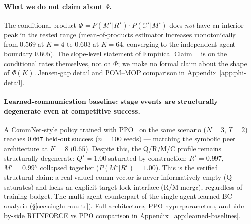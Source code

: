 \documentclass{article}
\begin{document}
\paragraph{What we do not claim about $\Phi$.} The conditional product $\Phi = P(M^\star|R^\star)\!\cdot\!P(C^\star|M^\star)$ does \emph{not} have an interior peak in the tested range (mean-of-products estimator increases monotonically from $0.569$ at $K{=}4$ to $0.603$ at $K{=}64$, converging to the independent-agent boundary $0.605$). The slope-level statement of Empirical Claim~1 is on the conditional rates themselves, not on $\Phi$; we make no formal claim about the shape of $\Phi(K)$. Jensen-gap detail and POM--MOP comparison in Appendix~\ref{app:phi-detail}.

\paragraph{Learned-communication baseline: stage events are structurally degenerate even at competitive success.}
A CommNet-style policy \citep{sukhbaatar2016commnet} trained with PPO~\citep{schulman2017proximal} on the same scenario ($N{=}3$, $T{=}2$) reaches $0.667$ held-out success ($n{=}100$ seeds) --- matching the symbolic peer architecture at $K{=}8$ ($0.65$). Despite this, the Q/R/M/C profile remains structurally degenerate: $Q^\star{=}1.00$ saturated by construction; $R^\star{=}0.997$, $M^\star{=}0.997$ collapsed together ($P(M^\star|R^\star){=}1.00$). This is the verified structural claim: a real-valued comm vector is never informatively empty (Q saturates) and lacks an explicit target-lock interface (R/M merge), regardless of training budget. The multi-agent counterpart of the single-agent learned-BC analysis (\S\ref{sec:single-results}). Full architecture, PPO hyperparameters, and side-by-side REINFORCE vs PPO comparison in Appendix~\ref{app:learned-baselines}.
\end{document}
